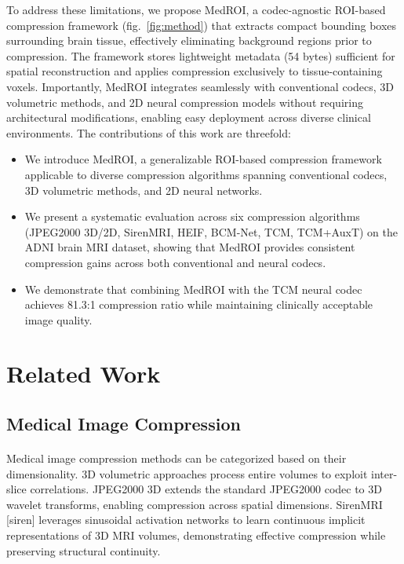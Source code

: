 \documentclass[runningheads]{llncs}
\begin{document}
To address these limitations, we propose MedROI, a codec-agnostic ROI-based compression framework (fig.~\ref{fig:method}) that extracts compact bounding boxes surrounding brain tissue, effectively eliminating background regions prior to compression. The framework stores lightweight metadata (54 bytes) sufficient for spatial reconstruction and applies compression exclusively to tissue-containing voxels. Importantly, MedROI integrates seamlessly with conventional codecs, 3D volumetric methods, and 2D neural compression models without requiring architectural modifications, enabling easy deployment across diverse clinical environments. The contributions of this work are threefold: 
\vspace{-0.25cm}
\begin{itemize} \item We introduce MedROI, a generalizable ROI-based compression framework applicable to diverse compression algorithms spanning conventional codecs, 3D volumetric methods, and 2D neural networks. \item We present a systematic evaluation across six compression algorithms (JPEG2000 3D/2D, SirenMRI, HEIF, BCM-Net, TCM, TCM+AuxT) on the ADNI brain MRI dataset, showing that MedROI provides consistent compression gains across both conventional and neural codecs.\item We demonstrate that combining MedROI with the TCM neural codec achieves 81.3:1 compression ratio while maintaining clinically acceptable image quality. \end{itemize}


\section{Related Work}
\subsection{Medical Image Compression}
\paragraph{}Medical image compression methods can be categorized based on their dimensionality. 3D volumetric approaches process entire volumes to exploit inter-slice correlations. JPEG2000 3D extends the standard JPEG2000 codec to 3D wavelet transforms, enabling compression across spatial dimensions. SirenMRI [siren] leverages sinusoidal activation networks to learn continuous implicit representations of 3D MRI volumes, demonstrating effective compression while preserving structural continuity.
\end{document}
